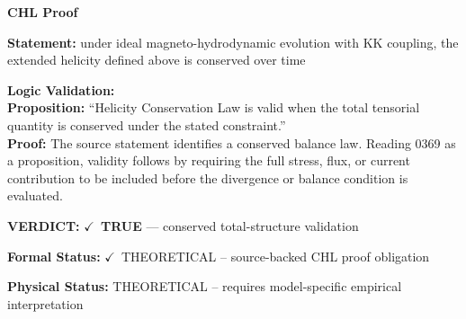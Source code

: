 \vspace{0.45em}
\noindent\textbf{CHL Proof}\par
\textbf{Statement:} under ideal magneto-hydrodynamic evolution with KK coupling, the extended helicity
defined above is conserved over time

\textbf{Logic Validation:}\\
\textbf{Proposition:} ``Helicity Conservation Law is valid when the total tensorial quantity is conserved under
the stated constraint.''\\
\textbf{Proof:} The source statement identifies a conserved balance law. Reading 0369 as a proposition,
validity follows by requiring the full stress, flux, or current contribution to be
included before the divergence or balance condition is evaluated.

\textbf{VERDICT:} \ensuremath{\checkmark}\ \textbf{TRUE} --- conserved total-structure validation

\textbf{Formal Status:} \ensuremath{\checkmark}\ THEORETICAL -- source-backed CHL proof obligation

\textbf{Physical Status:} THEORETICAL -- requires model-specific empirical interpretation
\par\vspace{0.45em}
\par
\ifTZPDarkEdition
{}
\fi
\endgroup
\endgroup
